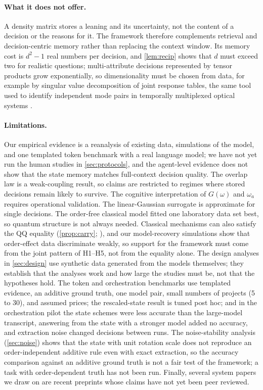 \documentclass[11pt]{article}
\theoremstyle{definition}
\theoremstyle{remark}
\begin{document}
\paragraph{What it does not offer.} A density matrix stores a leaning and its uncertainty, not the content of a decision or the reasons for it. The framework therefore complements retrieval and decision-centric memory rather than replacing the context window. Its memory cost is $d^2-1$ real numbers per decision, and \cref{lem:recip} shows that $d$ must exceed two for realistic questions; multi-attribute decisions represented by tensor products grow exponentially, so dimensionality must be chosen from data, for example by singular value decomposition of joint response tables, the same tool used to identify independent mode pairs in temporally multiplexed optical systems \citep{li2020temporal}.

\paragraph{Limitations.} Our empirical evidence is a reanalysis of existing data, simulations of the model, and one templated token benchmark with a real language model; we have not yet run the human studies in \cref{sec:protocols}, and the agent-level evidence does not show that the state memory matches full-context decision quality. The overlap law is a weak-coupling result, so claims are restricted to regimes where stored decisions remain likely to survive. The cognitive interpretation of $G(\omega)$ and $\omega_a$ requires operational validation. The linear-Gaussian surrogate is approximate for single decisions. The order-free classical model fitted one laboratory data set best, so quantum structure is not always needed. Classical mechanisms can also satisfy the QQ equality (\cref{prop:carry}; \citealp{kang2026}), and our model-recovery simulations show that order-effect data discriminate weakly, so support for the framework must come from the joint pattern of H1--H5, not from the equality alone. The design analyses in \cref{sec:design} use synthetic data generated from the models themselves; they establish that the analyses work and how large the studies must be, not that the hypotheses hold. The token and orchestration benchmarks use templated evidence, an additive ground truth, one model pair, small numbers of projects (5 to 30), and assumed prices; the rescaled-state result is tuned post hoc; and in the orchestration pilot the state schemes were less accurate than the large-model transcript, answering from the state with a stronger model added no accuracy, and extraction noise changed decisions between runs. The noise-stability analysis (\cref{sec:noise}) shows that the state with unit rotation scale does not reproduce an order-independent additive rule even with exact extraction, so the accuracy comparison against an additive ground truth is not a fair test of the framework; a task with order-dependent truth has not been run. Finally, several system papers we draw on are recent preprints whose claims have not yet been peer reviewed.
\end{document}
